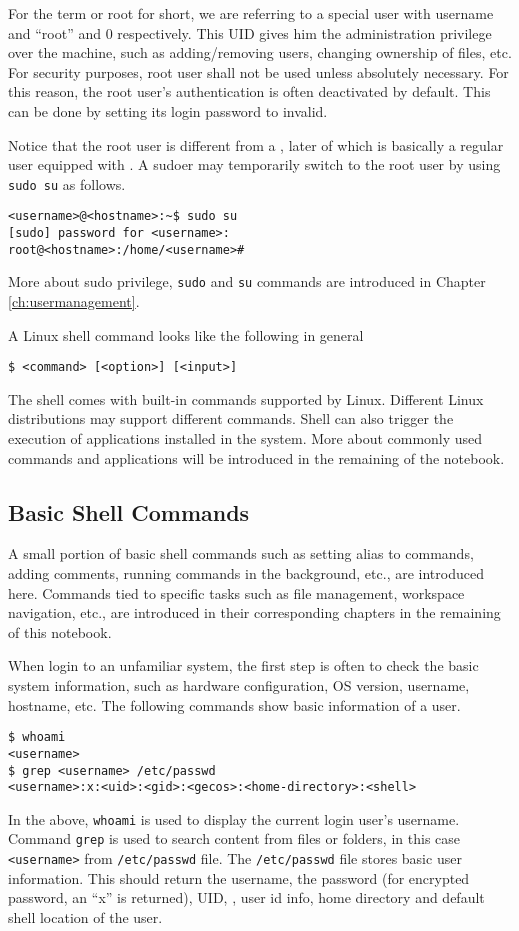 For the term  or root for short, we are referring to a special user with username and  ``root'' and 0 respectively. This UID gives him the administration privilege over the machine, such as adding/removing users, changing ownership of files, etc. For security purposes, root user shall not be used unless absolutely necessary. For this reason, the root user's authentication is often deactivated by default. This can be done by setting its login password to invalid.

Notice that the root user is different from a , later of which is basically a regular user equipped with . A sudoer may temporarily switch to the root user by using \verb|sudo su| as follows.
\begin{lstlisting}
<username>@<hostname>:~$ sudo su
[sudo] password for <username>:
root@<hostname>:/home/<username>#
\end{lstlisting}
More about sudo privilege, \verb|sudo| and \verb|su| commands are introduced in Chapter \ref{ch:usermanagement}.

A Linux shell command looks like the following in general
\begin{lstlisting}
$ <command> [<option>] [<input>]
\end{lstlisting}

The shell comes with built-in commands supported by Linux. Different Linux distributions may support different commands. Shell can also trigger the execution of applications installed in the system. More about commonly used commands and applications will be introduced in the remaining of the notebook.

\subsection{Basic Shell Commands}

A small portion of basic shell commands such as setting alias to commands, adding comments, running commands in the background, etc.,  are introduced here. Commands tied to specific tasks such as file management, workspace navigation, etc., are introduced in their corresponding chapters in the remaining of this notebook.

When login to an unfamiliar system, the first step is often to check the basic system information, such as hardware configuration, OS version, username, hostname, etc. The following commands show basic information of a user.
\begin{lstlisting}
$ whoami
<username>
$ grep <username> /etc/passwd
<username>:x:<uid>:<gid>:<gecos>:<home-directory>:<shell>
\end{lstlisting}
In the above, \verb|whoami| is used to display the current login user's username. Command \verb|grep| is used to search content from files or folders, in this case \verb|<username>| from \verb|/etc/passwd| file. The \verb|/etc/passwd| file stores basic user information. This should return the username, the password (for encrypted password, an ``x'' is returned), UID, , user id info, home directory and default shell location of the user.

